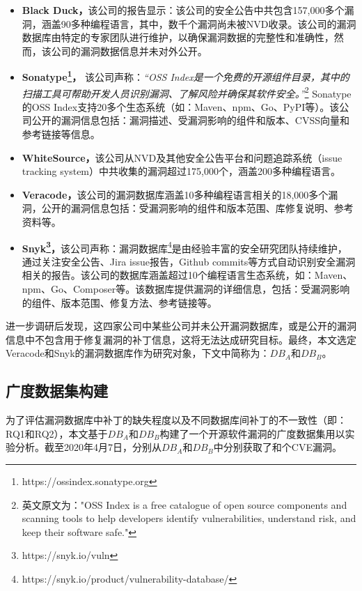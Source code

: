 \begin{itemize}[leftmargin=*]
\item\textbf{Black Duck，}该公司的报告显示：该公司的安全公告中共包含157,000多个漏洞，涵盖90多种编程语言，其中，数千个漏洞尚未被NVD收录。该公司的漏洞数据库由特定的专家团队进行维护，以确保漏洞数据的完整性和准确性，然而，该公司的漏洞数据信息并未对外公开。
\item\textbf{Sonatype\footnote{https://ossindex.sonatype.org}，} 该公司声称：\textit{“OSS Index是一个免费的开源组件目录，其中的扫描工具可帮助开发人员识别漏洞、了解风险并确保其软件安全。”}\footnote{英文原文为："OSS Index is a free catalogue of open source components and scanning tools to help developers identify vulnerabilities, understand risk, and keep their software safe."} Sonatype的OSS Index支持20多个生态系统（如：Maven、npm、Go、PyPI等）。该公司公开的漏洞信息包括：漏洞描述、受漏洞影响的组件和版本、CVSS向量和参考链接等信息。
\item\textbf{WhiteSource，}该公司从NVD及其他安全公告平台和问题追踪系统（issue tracking system）中共收集的漏洞超过175,000个，涵盖200多种编程语言。
\item\textbf{Veracode，}该公司的漏洞数据库涵盖10多种编程语言相关的18,000多个漏洞，公开的漏洞信息包括：受漏洞影响的组件和版本范围、库修复说明、参考资料等。
\item\textbf{Snyk\footnote{https://snyk.io/vuln}，}该公司声称：漏洞数据库\footnote{https://snyk.io/product/vulnerability-database/}是由经验丰富的安全研究团队持续维护，通过关注安全公告、Jira issue报告，Github commits等方式自动识别安全漏洞相关的报告。该公司的数据库涵盖超过10个编程语言生态系统，如：Maven、npm、Go、Composer等。该数据库提供漏洞的详细信息，包括：受漏洞影响的组件、版本范围、修复方法、参考链接等。
\end{itemize}

进一步调研后发现，这四家公司中某些公司并未公开漏洞数据库，或是公开的漏洞信息中不包含用于修复漏洞的补丁信息，这将无法达成研究目标。最终，本文选定Veracode和Snyk的漏洞数据库作为研究对象，下文中简称为：$DB_A$和$DB_B$。


\subsection{广度数据集构建}
为了评估漏洞数据库中补丁的缺失程度以及不同数据库间补丁的不一致性（即：RQ1和RQ2），本文基于$DB_A$和$DB_B$构建了一个开源软件漏洞的广度数据集用以实验分析。截至2020年4月7日，分别从$DB_A$和$DB_B$中分别获取了和个CVE漏洞。

